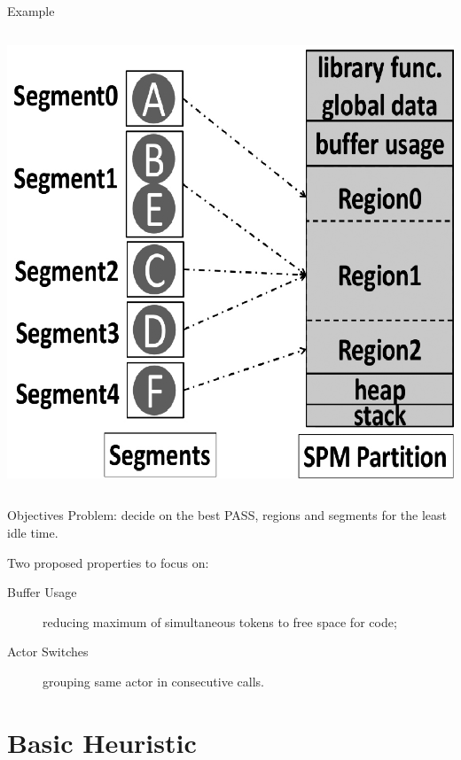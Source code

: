 \documentclass{beamer}
\begin{document}
\begin{frame}{Example}
\begin{columns}
\begin{column}{0.7\textwidth}
\begin{center}
        \includegraphics[height=0.75\textheight]{fig2_2}
      \end{center}
    \end{column}
  \end{columns}
\end{frame}

\begin{frame}{Objectives}
  Problem: decide on the best PASS, regions and segments for the least idle time.

  Two proposed properties to focus on:
  \begin{description}
    \item[Buffer Usage] reducing maximum of simultaneous tokens to free space for code;
    \item[Actor Switches] grouping same actor in consecutive calls.
  \end{description}
\end{frame}


\section{Basic Heuristic}
\end{document}
